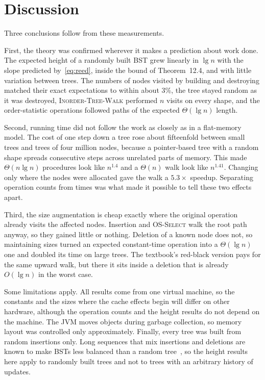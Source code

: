 \documentclass[conference]{IEEEtran}
\newcommand{\WALK}{\textsc{Inorder-Tree-Walk}}
\newcommand{\SEL}{\textsc{OS-Select}}
\begin{document}
\section{Discussion}

Three conclusions follow from these measurements.

First, the theory was confirmed wherever it makes a prediction about work done.
The expected height of a randomly built BST grew linearly in $\lg n$ with the
slope predicted by~\eqref{eq:reed}, inside the bound of Theorem~12.4, and with
little variation between trees. The numbers of nodes visited by building and
destroying matched their exact expectations to within about 3\%, the tree stayed
random as it was destroyed, \WALK{} performed $n$ visits on every shape, and
the order-statistic operations followed paths of the expected
$\Theta(\lg n)$ length.

Second, running time did not follow the work as closely as in a flat-memory
model. The cost of one step down a tree rose about fifteenfold between small
trees and trees of four million nodes, because a pointer-based tree with a
random shape spreads consecutive steps across unrelated parts of memory.
This made $\Theta(n\lg n)$ procedures look like $n^{1.4}$ and a $\Theta(n)$
walk look like $n^{1.41}$. Changing only where the nodes were allocated gave
the walk a $5.3\times$ speedup. Separating operation counts from times was
what made it possible to tell these two effects apart.

Third, the size augmentation is cheap exactly where the original operation
already visits the affected nodes. Insertion and \SEL{} walk the root path
anyway, so they gained little or nothing. Deletion of a known node does not,
so maintaining sizes turned an expected constant-time operation into a
$\Theta(\lg n)$ one and doubled its time on large trees. The textbook's
red-black version pays for the same upward walk, but there it sits inside a
deletion that is already $O(\lg n)$ in the worst case.

Some limitations apply. All results come from one virtual machine, so the
constants and the sizes where the cache effects begin will differ on other
hardware, although the operation counts and the height results do not depend
on the machine. The JVM moves objects during garbage collection, so memory
layout was controlled only approximately. Finally, every tree was built from
random insertions only. Long sequences that mix insertions and deletions are
known to make BSTs less balanced than a random tree~\cite{eppinger}, so the
height results here apply to randomly built trees and not to trees with an
arbitrary history of updates.
\end{document}
